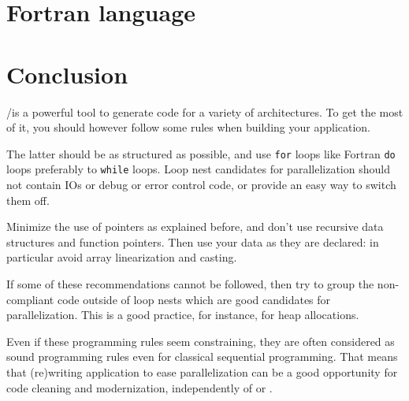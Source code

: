 \documentclass[a4paper]{article}
\begin{document}
\section{Fortran language}
\label{sec:fortran-language}

\section{Conclusion}
\label{sec:conclusion}

\Apips/\Apfa is a powerful tool to generate code for a variety
of architectures. To get the most of it, you should however follow
some rules when building your application.

The latter should be as structured as possible, and use
\lstinline{for} loops like Fortran \lstinline|do| loops preferably to
\lstinline{while} loops. Loop nest candidates for parallelization should
not contain IOs or debug or error control code, or provide an easy way
to switch them off.

Minimize the use of pointers as explained before, and don't use
recursive data structures and function pointers. Then use your data as they are
declared: in particular avoid array linearization and casting.

If some of these recommendations cannot be followed, then try to group
the non-compliant code outside of loop nests which are good
candidates for parallelization.  This is a good practice, for instance,
for heap allocations.

Even if these programming rules seem constraining, they are often
considered as sound programming rules even for classical sequential
programming. That means that (re)writing application to ease
parallelization can be a good opportunity for code cleaning and
modernization, independently of \Apips or \Apfa.


\end{document}
